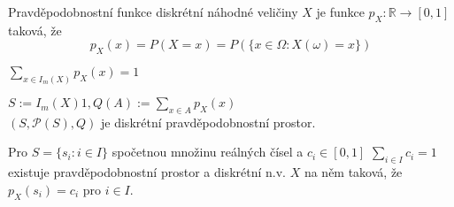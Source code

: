 \documentclass[../main.tex]{subfiles}
\begin{document}
\begin{definition}
    Pravděpodobnostní funkce diskrétní náhodné veličiny $X$ je funkce $p_X : \mathbb{R} \rightarrow [0,1]$ taková, že 
    \[p_X(x) = P(X = x) = P(\{x \in \Omega : X(\omega) = x\})\]
\end{definition}

\begin{definition}
    $\sum_{x\in I_m(X)}p_X(x) = 1$
\end{definition}

\begin{definition}
    $S:= I_m(X) 1, Q(A):=\sum_{x\in A} p_X(x)$\\
    $(S,\mathcal{P}(S),Q)$ je diskrétní pravděpodobnostní prostor.
\end{definition}

\begin{definition}
    Pro $S = \{s_i : i \in I\}$ spočetnou množinu reálných čísel a $c_i \in [0,1]$ $\sum_{i\in I} c_i =1$ existuje pravděpodobnostní
    prostor a diskrétní n.v. $X$ na něm taková, že $p_X(s_i) = c_i$ pro $i \in I$.
\end{definition}
\end{document}
